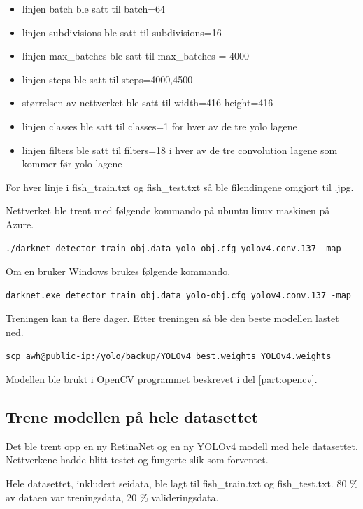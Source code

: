 \begin{itemize}
  \item linjen batch ble satt til batch=64
  \item linjen subdivisions ble satt til subdivisions=16
  \item linjen max\_batches ble satt til max\_batches = 4000
  \item linjen steps ble satt til steps=4000,4500
  \item størrelsen av nettverket ble satt til width=416 height=416
  \item linjen classes ble satt til classes=1 for hver av de tre yolo lagene
  \item linjen filters ble satt til filters=18 i hver av de tre convolution lagene som kommer før yolo lagene
\end{itemize}

For hver linje i fish\_train.txt og fish\_test.txt så ble filendingene omgjort til .jpg.

Nettverket ble trent med følgende kommando på ubuntu linux maskinen på Azure.

\begin{verbatim}
./darknet detector train obj.data yolo-obj.cfg yolov4.conv.137 -map
\end{verbatim}

Om en bruker Windows brukes følgende kommando.

\begin{verbatim}
darknet.exe detector train obj.data yolo-obj.cfg yolov4.conv.137 -map
\end{verbatim}

Treningen kan ta flere dager. Etter treningen så ble den beste modellen lastet ned.

\begin{verbatim}
scp awh@public-ip:/yolo/backup/YOLOv4_best.weights YOLOv4.weights
\end{verbatim}

Modellen ble brukt i OpenCV programmet beskrevet i del \ref{part:opencv}. 

\subsection{Trene modellen på hele datasettet}

Det ble trent opp en ny RetinaNet og en ny YOLOv4 modell med hele datasettet. Nettverkene hadde blitt testet og fungerte slik som forventet.

Hele datasettet, inkludert seidata, ble lagt til fish\_train.txt og fish\_test.txt. 80 \% av dataen var treningsdata, 20 \% valideringsdata.

